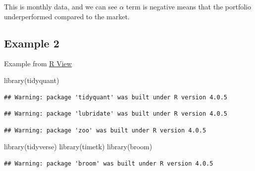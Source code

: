 \documentclass[
]{book}
\newenvironment{Shaded}{\begin{snugshade}}{\end{snugshade}}
\newcommand{\FunctionTok}[1]{\textcolor[rgb]{0.00,0.00,0.00}{#1}}
\newcommand{\NormalTok}[1]{#1}
\begin{document}
This is monthly data, and we can see \(\alpha\) term is negative means that the portfolio underperformed compared to the
market.

\hypertarget{example-2}{%
\subsection{Example 2}\label{example-2}}

Example from \href{https://rviews.rstudio.com/2018/04/11/introduction-to-fama-french/}{R View}

\begin{Shaded}
\begin{Highlighting}[]
\FunctionTok{library}\NormalTok{(tidyquant)}
\end{Highlighting}
\end{Shaded}

\begin{verbatim}
## Warning: package 'tidyquant' was built under R version 4.0.5
\end{verbatim}

\begin{verbatim}
## Warning: package 'lubridate' was built under R version 4.0.5
\end{verbatim}

\begin{verbatim}
## Warning: package 'zoo' was built under R version 4.0.5
\end{verbatim}

\begin{Shaded}
\begin{Highlighting}[]
\FunctionTok{library}\NormalTok{(tidyverse)}
\FunctionTok{library}\NormalTok{(timetk)}
\FunctionTok{library}\NormalTok{(broom)}
\end{Highlighting}
\end{Shaded}

\begin{verbatim}
## Warning: package 'broom' was built under R version 4.0.5
\end{verbatim}
\end{document}
